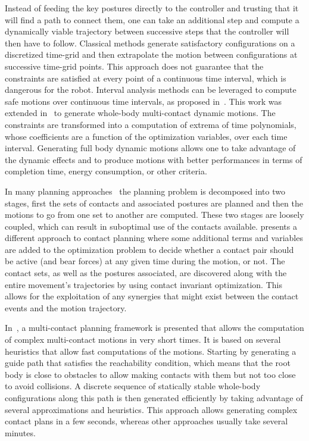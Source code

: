 Instead of feeding the key postures directly to the controller and trusting that it will find a path to connect them, one can take an additional step and compute a dynamically viable trajectory between successive steps that the controller will then have to follow.
Classical methods generate satisfactory configurations on a discretized time-grid and then extrapolate the motion between configurations at successive time-grid points.
This approach does not guarantee that the constraints are satisfied at every point of a continuous time interval, which is dangerous for the robot.
Interval analysis methods can be leveraged to compute safe motions over continuous time intervals, as proposed in~\cite{lengagne2011planning}.
This work was extended in~\cite{lengagne2013generation} to generate whole-body multi-contact dynamic motions.
The constraints are transformed into a computation of extrema of time polynomials, whose coefficients are a function of the optimization variables, over each time interval.
Generating full body dynamic motions allows one to take advantage of the dynamic effects and to produce motions with better performances in terms of completion time, energy consumption, or other criteria.

In many planning approaches~\cite{kuffner2005motion, chestnutt2007navigation, hauser:ijrr:2008, kolter2008control, bouyarmane:icra:2011} the planning problem is decomposed into two stages, first the sets of contacts and associated postures are planned and then the motions to go from one set to another are computed.
These two stages are loosely coupled, which can result in suboptimal use of the contacts available.
\cite{mordatch:acm:2012} presents a different approach to contact planning where some additional terms and variables are added to the optimization problem to decide whether a contact pair should be active (and bear forces) at any given time during the motion, or not.
The contact sets, as well as the postures associated, are discovered along with the entire movement's trajectories by using contact invariant optimization.
This allows for the exploitation of any synergies that might exist between the contact events and the motion trajectory.

In~\cite{tonneauijrr16}, a multi-contact planning framework is presented that allows the computation of complex multi-contact motions in very short times.
It is based on several heuristics that allow fast computations of the motions.
Starting by generating a guide path that satisfies the reachability condition, which means that the root body is close to obstacles to allow making contacts with them but not too close to avoid collisions.
A discrete sequence of statically stable whole-body configurations along this path is then generated efficiently by taking advantage of several approximations and heuristics.
This approach allows generating complex contact plans in a few seconds, whereas other approaches usually take several minutes.

